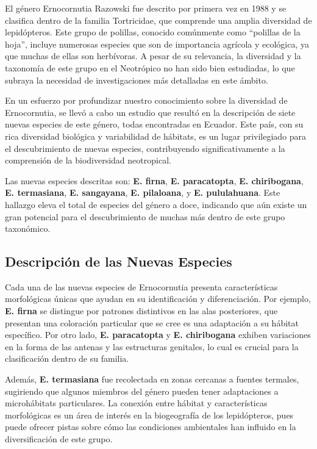 \documentclass[
  letterpaper,
  DIV=11,
  numbers=noendperiod,
  oneside]{scrreprt}
\begin{document}
El género Ernocornutia Razowski fue descrito por primera vez en 1988 y
se clasifica dentro de la familia Tortricidae, que comprende una amplia
diversidad de lepidópteros. Este grupo de polillas, conocido comúnmente
como ``polillas de la hoja'', incluye numerosas especies que son de
importancia agrícola y ecológica, ya que muchas de ellas son herbívoras.
A pesar de su relevancia, la diversidad y la taxonomía de este grupo en
el Neotrópico no han sido bien estudiadas, lo que subraya la necesidad
de investigaciones más detalladas en este ámbito.

En un esfuerzo por profundizar nuestro conocimiento sobre la diversidad
de Ernocornutia, se llevó a cabo un estudio que resultó en la
descripción de siete nuevas especies de este género, todas encontradas
en Ecuador. Este país, con su rica diversidad biológica y variabilidad
de hábitats, es un lugar privilegiado para el descubrimiento de nuevas
especies, contribuyendo significativamente a la comprensión de la
biodiversidad neotropical.

Las nuevas especies descritas son: \textbf{E. firna}, \textbf{E.
paracatopta}, \textbf{E. chiribogana}, \textbf{E. termasiana},
\textbf{E. sangayana}, \textbf{E. pilaloana}, y \textbf{E. pululahuana}.
Este hallazgo eleva el total de especies del género a doce, indicando
que aún existe un gran potencial para el descubrimiento de muchas más
dentro de este grupo taxonómico.

\subsection{Descripción de las Nuevas
Especies}\label{descripciuxf3n-de-las-nuevas-especies}

Cada una de las nuevas especies de Ernocornutia presenta características
morfológicas únicas que ayudan en su identificación y diferenciación.
Por ejemplo, \textbf{E. firna} se distingue por patrones distintivos en
las alas posteriores, que presentan una coloración particular que se
cree es una adaptación a su hábitat específico. Por otro lado,
\textbf{E. paracatopta} y \textbf{E. chiribogana} exhiben variaciones en
la forma de las antenas y las estructuras genitales, lo cual es crucial
para la clasificación dentro de su familia.

Además, \textbf{E. termasiana} fue recolectada en zonas cercanas a
fuentes termales, sugiriendo que algunos miembros del género pueden
tener adaptaciones a microhábitats particulares. La conexión entre
hábitat y características morfológicas es un área de interés en la
biogeografía de los lepidópteros, pues puede ofrecer pistas sobre cómo
las condiciones ambientales han influido en la diversificación de este
grupo.
\end{document}
